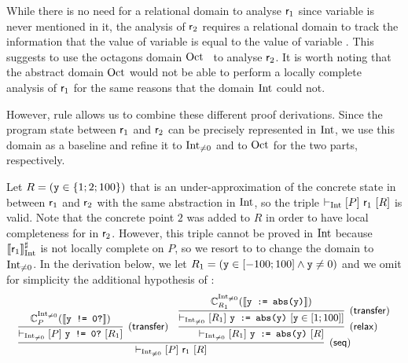 \begin{example}
	While there is no need for a relational domain to analyse $\mathsf{r}_1$ since  variable  is never mentioned in it,
	the analysis of $\mathsf{r}_2$ requires a relational domain to track the information that the value of variable  is equal to the value of variable .
	This suggests to use the octagons domain $\text{Oct}$~\cite{Mine06} to analyse $\mathsf{r}_2$. It is worth noting that the abstract domain $\text{Oct}$ would not be able to perform a locally complete analysis of $\mathsf{r}_1$ for the same reasons that the domain $\text{Int}$ could not.
	
	However, rule  allows us to combine these different proof derivations. Since the program state between $\mathsf{r}_1$ and $\mathsf{r}_2$ can be precisely represented in $\text{Int}$, we use this domain as a baseline and refine it to $\text{Int}_{\neq 0}$ and to $\text{Oct}$ for the two parts, respectively.
	
	
	Let $R = (\texttt{y} \in \{ 1; 2; 100 \})$ that is an under\hyp{}approximation of the concrete state in between $\mathsf{r}_1$ and $\mathsf{r}_2$ with the same abstraction in $\text{Int}$, so the triple $\vdash_{\text{Int}}\nobreak[P]~\mathsf{r}_1~[R]$ is valid. Note that the concrete point $2$ was added to $R$ in order to have local completeness for  in $\mathsf{r}_2$. However, this triple cannot be proved in $\text{Int}$ because $\llbracket\mathsf{r}_1\rrbracket^{\sharp}_{\text{Int}}$ is not locally complete on $P$, so we resort to  to change the domain to $\text{Int}_{\neq 0}$.
	In the derivation below, we let $R_1 = (\texttt{y} \in [-100; 100] \land \texttt{y} \neq 0)$ and we omit for simplicity the additional hypothesis of :
	\[
	\small
	\infer[(\mathsf{seq})]
	{\lcl{\Int_{\neq 0}}{P}{\regr_1}{R}
	}
	{
		\infer[(\mathsf{transfer})]
		{\lcl{\Int_{\neq 0}}{P}{\code{y != 0?}}{R_1}}{ \complete{\Int_{\neq 0}}{P}{\denot{\code{y != 0?}}} }
		&
		\infer[(\mathsf{relax})]
		{\lcl{\Int_{\neq 0}}{R_1}{\code{y := abs(y)}}{R}}
		{\infer[(\mathsf{transfer})]
			{\lcl{\Int_{\neq 0}}{R_1}{\code{y := abs(y)}}{\code{y} \in [1; 100]}}{ \complete{\Int_{\neq 0}}{R_1}{\denot{\code{y := abs(y)}}} }
		}
	}
	\]
	

\end{example}
